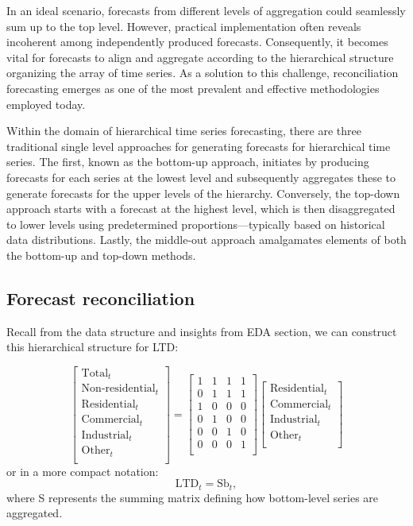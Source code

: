 \documentclass[11pt,a4paper,]{article}
\begin{document}
In an ideal scenario, forecasts from different levels of aggregation could seamlessly sum up to the top level. However, practical implementation often reveals incoherent among independently produced forecasts. Consequently, it becomes vital for forecasts to align and aggregate according to the hierarchical structure organizing the array of time series. As a solution to this challenge, reconciliation forecasting emerges as one of the most prevalent and effective methodologies employed today.

Within the domain of hierarchical time series forecasting, there are three traditional single level approaches for generating forecasts for hierarchical time series. The first, known as the bottom-up approach, initiates by producing forecasts for each series at the lowest level and subsequently aggregates these to generate forecasts for the upper levels of the hierarchy. Conversely, the top-down approach starts with a forecast at the highest level, which is then disaggregated to lower levels using predetermined proportions---typically based on historical data distributions. Lastly, the middle-out approach amalgamates elements of both the bottom-up and top-down methods.

\subsection{Forecast reconciliation}\label{forecast-reconciliation}

Recall from the data structure and insights from EDA section, we can construct this hierarchical structure for LTD:

\[
\begin{bmatrix}
  \text{Total}_{t} \\
  \text{Non-residential}_{t} \\
  \text{Residential}_{t} \\
  \text{Commercial}_{t} \\
  \text{Industrial}_{t} \\
  \text{Other}_{t} \\
  \end{bmatrix}
=
\begin{bmatrix}
  1 & 1 & 1 & 1 \\
  0 & 1 & 1 & 1 \\
  1 & 0 & 0 & 0 \\
  0 & 1 & 0 & 0 \\
  0 & 0 & 1 & 0 \\
  0 & 0 & 0 & 1 \\
\end{bmatrix}
\begin{bmatrix}
  \text{Residential}_{t} \\
  \text{Commercial}_{t} \\
  \text{Industrial}_{t} \\
  \text{Other}_{t} \\
\end{bmatrix}
\]
or in a more compact notation:
\[
\text{LTD}_{t} = \text{S}\text{b}_{t},
\]
where S represents the summing matrix defining how bottom-level series are aggregated.
\end{document}
